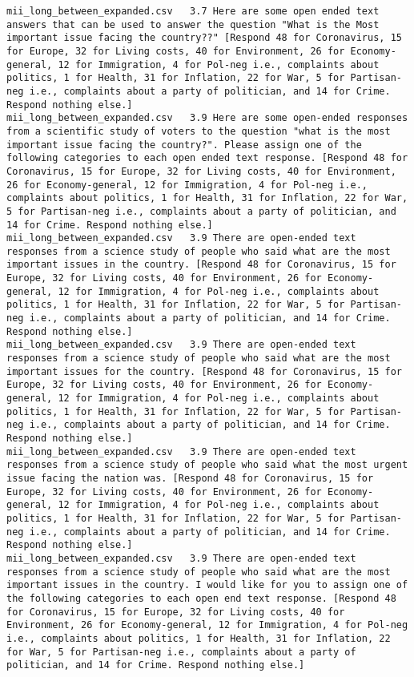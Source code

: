 \begin{lstlisting}[label=lst:promptvariants]
mii_long_between_expanded.csv	3.7	Here are some open ended text answers that can be used to answer the question "What is the Most important issue facing the country??" [Respond 48 for Coronavirus, 15 for Europe, 32 for Living costs, 40 for Environment, 26 for Economy-general, 12 for Immigration, 4 for Pol-neg i.e., complaints about politics, 1 for Health, 31 for Inflation, 22 for War, 5 for Partisan-neg i.e., complaints about a party of politician, and 14 for Crime. Respond nothing else.]
mii_long_between_expanded.csv	3.9	Here are some open-ended responses from a scientific study of voters to the question "what is the most important issue facing the country?". Please assign one of the following categories to each open ended text response. [Respond 48 for Coronavirus, 15 for Europe, 32 for Living costs, 40 for Environment, 26 for Economy-general, 12 for Immigration, 4 for Pol-neg i.e., complaints about politics, 1 for Health, 31 for Inflation, 22 for War, 5 for Partisan-neg i.e., complaints about a party of politician, and 14 for Crime. Respond nothing else.]
mii_long_between_expanded.csv	3.9	There are open-ended text responses from a science study of people who said what are the most important issues in the country. [Respond 48 for Coronavirus, 15 for Europe, 32 for Living costs, 40 for Environment, 26 for Economy-general, 12 for Immigration, 4 for Pol-neg i.e., complaints about politics, 1 for Health, 31 for Inflation, 22 for War, 5 for Partisan-neg i.e., complaints about a party of politician, and 14 for Crime. Respond nothing else.]
mii_long_between_expanded.csv	3.9	There are open-ended text responses from a science study of people who said what are the most important issues for the country. [Respond 48 for Coronavirus, 15 for Europe, 32 for Living costs, 40 for Environment, 26 for Economy-general, 12 for Immigration, 4 for Pol-neg i.e., complaints about politics, 1 for Health, 31 for Inflation, 22 for War, 5 for Partisan-neg i.e., complaints about a party of politician, and 14 for Crime. Respond nothing else.]
mii_long_between_expanded.csv	3.9	There are open-ended text responses from a science study of people who said what the most urgent issue facing the nation was. [Respond 48 for Coronavirus, 15 for Europe, 32 for Living costs, 40 for Environment, 26 for Economy-general, 12 for Immigration, 4 for Pol-neg i.e., complaints about politics, 1 for Health, 31 for Inflation, 22 for War, 5 for Partisan-neg i.e., complaints about a party of politician, and 14 for Crime. Respond nothing else.]
mii_long_between_expanded.csv	3.9	There are open-ended text responses from a science study of people who said what are the most important issues in the country. I would like for you to assign one of the following categories to each open end text response. [Respond 48 for Coronavirus, 15 for Europe, 32 for Living costs, 40 for Environment, 26 for Economy-general, 12 for Immigration, 4 for Pol-neg i.e., complaints about politics, 1 for Health, 31 for Inflation, 22 for War, 5 for Partisan-neg i.e., complaints about a party of politician, and 14 for Crime. Respond nothing else.]

\end{lstlisting}
